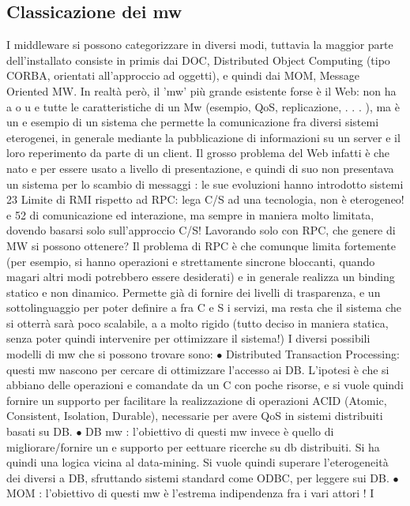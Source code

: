 \subsection{Classicazione dei mw}
I middleware si possono categorizzare in diversi modi, tuttavia la maggior parte
dell'installato consiste in primis dai DOC, Distributed Object Computing (tipo
CORBA, orientati all'approccio ad oggetti), e quindi dai MOM, Message Oriented MW. In realtà però, il 'mw' più grande
esistente forse è il Web: non ha
a
o
u
e
tutte le caratteristiche di un Mw (esempio, QoS, replicazione, . . . ), ma è un
e
esempio di un sistema che permette la comunicazione fra diversi sistemi eterogenei, in generale mediante la
pubblicazione di informazioni su un server e il loro
reperimento da parte di un client. Il grosso problema del Web infatti è che nato
e
per essere usato a livello di presentazione, e quindi di suo non presentava un
sistema per lo scambio di messaggi : le sue evoluzioni hanno introdotto sistemi
23 Limite
di RMI rispetto ad RPC: lega C/S ad una tecnologia, non è eterogeneo!
e
52
di comunicazione ed interazione, ma sempre in maniera molto limitata, dovendo
basarsi solo sull'approccio C/S!
Lavorando solo con RPC, che genere di MW si possono ottenere? Il problema
di RPC è che comunque limita fortemente (per esempio, si hanno operazioni
e
strettamente sincrone bloccanti, quando magari altri modi potrebbero essere
desiderati) e in generale realizza un binding statico e non dinamico. Permette
già di fornire dei livelli di trasparenza, e un sottolinguaggio per poter definire
a
fra C e S i servizi, ma resta che il sistema che si otterrà sarà poco scalabile,
a
a
molto rigido (tutto deciso in maniera statica, senza poter quindi intervenire per
ottimizzare il sistema!)
I diversi possibili modelli di mw che si possono trovare sono:
$\bullet$ Distributed Transaction Processing: questi mw nascono per cercare di
ottimizzare l'accesso ai DB. L'ipotesi è che si abbiano delle operazioni
e
comandate da un C con poche risorse, e si vuole quindi fornire un supporto
per facilitare la realizzazione di operazioni ACID (Atomic, Consistent,
Isolation, Durable), necessarie per avere QoS in sistemi distribuiti basati
su DB.
$\bullet$ DB mw : l'obiettivo di questi mw invece è quello di migliorare/fornire un
e
supporto per eettuare ricerche su db distribuiti. Si ha quindi una logica
vicina al data-mining. Si vuole quindi superare l'eterogeneità dei diversi
a
DB, sfruttando sistemi standard come ODBC, per leggere sui DB.
$\bullet$ MOM : l'obiettivo di questi mw è l'estrema indipendenza fra i vari attori ! I
